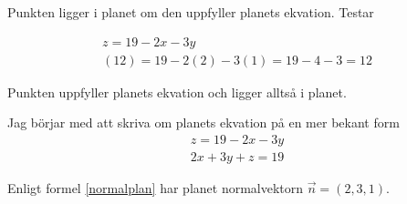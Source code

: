 \documentclass[../../main.tex]{subfiles}
\begin{document}
\begin{solution}{18}

Punkten ligger i planet om den uppfyller planets ekvation. Testar

\begin{align*}
z = 19 - 2x - 3y\\
(12) = 19 - 2(2) -3(1) = 19 - 4 - 3 = 12
\end{align*}

Punkten uppfyller planets ekvation och ligger alltså i planet.

Jag börjar med att skriva om planets ekvation på en mer bekant form
\begin{align*}
z = 19 - 2x - 3y\\
2x + 3y + z = 19
\end{align*}

Enligt formel \ref{normalplan} har planet normalvektorn $\Vec{n} = (2, 3, 1)$.


\end{solution}
\end{document}
